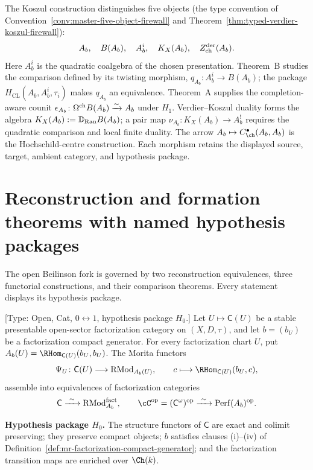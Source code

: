 \begin{remark}
\label{rem:mr-five-objects}
The Koszul construction distinguishes five objects
(the type convention of Convention~\ref{conv:master-five-object-firewall} and
Theorem~\ref{thm:typed-verdier-koszul-firewall}):
\[
 A_b,\quad B(A_b),\quad A_b^{i},
\quad K_X(A_b),\quad Z^{\mathrm{der}}_{\mathrm{ch}}(A_b).
\]
Here $A_b^i$ is the quadratic coalgebra of the chosen presentation.
Theorem~B studies the comparison defined by its twisting morphism,
$q_{A_b}\colon A_b^i\to B(A_b)$; the package
$H_{\mathrm{CL}}(A_b,A_b^i,\tau_i)$ makes $q_{A_b}$ an equivalence.
Theorem~A
supplies the completion-aware counit
$\epsilon_{A_b}\colon\Omega^{\mathrm{ch}} B(A_b)\xrightarrow{\sim} A_b$
under $H_1$.  Verdier--Koszul duality forms the algebra
$K_X(A_b):=\mathbb{D}_{\mathrm{Ran}} B(A_b)$; a pair map
$\nu_{A_b}\colon K_X(A_b)\to A_b^!$ requires the quadratic comparison
and local finite duality. The arrow
$A_b\mapsto C^\bullet_{\ch}(A_b,A_b)$ is the Hochschild-centre
construction.  Each morphism retains the displayed source, target,
ambient category, and hypothesis package.
\end{remark}

\section{Reconstruction and formation theorems with named hypothesis
packages}
\label{sec:mr-reconstruction}

The open Beilinson fork is governed by two reconstruction
equivalences, three functorial constructions, and their comparison
theorems.  Every statement displays its hypothesis package.

\begin{theorem}
\label{thm:mr-morita}
\textup{[Type: Open, Cat, $0\leftrightarrow 1$, hypothesis package
$H_0$.]}
Let $U\mapsto\mathsf C(U)$ be a stable presentable open-sector
factorization category on $(X,D,\tau)$, and let $b=(b_U)$ be a
factorization compact generator.  For every factorization chart $U$,
put $A_b(U)=\RHom_{\mathsf C(U)}(b_U,b_U)$.  The Morita functors
\[
 \Psi_U\colon\mathsf C(U)\longrightarrow
 \mathrm{RMod}_{A_b(U)},
 \qquad c\longmapsto\RHom_{\mathsf C(U)}(b_U,c),
\]
assemble into equivalences of factorization categories
\[
 \mathsf C\xrightarrow{\ \sim\ }
 \mathrm{RMod}^{\fact}_{A_b},
 \qquad
 \cC^\op=(\mathsf C^\omega)^\op
 \xrightarrow{\ \sim\ }
 \mathrm{Perf}(A_b)^\op .
\]

\textbf{Hypothesis package $H_0$.} The structure functors of
$\mathsf C$ are exact and colimit preserving; they preserve compact
objects; $b$ satisfies clauses \textup{(i)--(iv)} of
Definition~\ref{def:mr-factorization-compact-generator}; and the
factorization transition maps are enriched over $\Ch(k)$.
\end{theorem}

